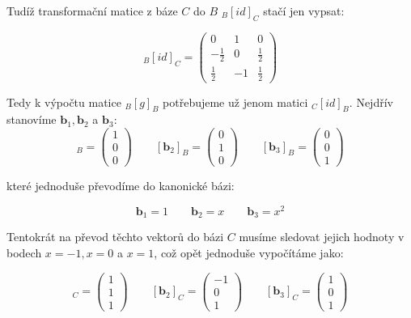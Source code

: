 \documentclass{../../../ksp}
\begin{document}
Tudíž transformační matice z báze $C$ do $B$ $_B[id]_C$ stačí jen vypsat:

\begin{equation}
    _B[id]_C = 
    \begin{pmatrix}
        0 & 1 & 0\\
        -\frac{1}{2} & 0 & \frac{1}{2}\\
        \frac{1}{2} & -1 & \frac{1}{2}
    \end{pmatrix}
\end{equation}

Tedy k výpočtu matice $_B[g]_B$ potřebujeme už jenom matici $_C[id]_B$.
Nejdřív stanovíme $\bm{b}_1, \bm{b}_2$ a $\bm{b}_3$:
\begin{equation}
    [\bm{b}_1]_B =
    \begin{pmatrix}
        1\\
        0\\
        0
    \end{pmatrix}
    \qquad
    [\bm{b}_2]_B =
    \begin{pmatrix}
        0\\
        1\\
        0
    \end{pmatrix}
    \qquad
    [\bm{b}_3]_B =
    \begin{pmatrix}
        0\\
        0\\
        1
    \end{pmatrix}
\end{equation}

které jednoduše převodíme do kanonické bázi:

\begin{equation}
    \bm{b}_1 = 1
    \qquad
    \bm{b}_2 = x
    \qquad
    \bm{b}_3 = x^2
\end{equation}

Tentokrát na převod těchto vektorů do bázi $C$ musíme sledovat jejich hodnoty v bodech
$x = -1, x = 0$ a $x = 1$, což opět jednoduše vypočítáme jako:

\begin{equation}
    [\bm{b}_1]_C =
    \begin{pmatrix}
        1\\
        1\\
        1
    \end{pmatrix}
    \qquad
    [\bm{b}_2]_C =
    \begin{pmatrix}
        -1\\
        0\\
        1
    \end{pmatrix}
    \qquad
    [\bm{b}_3]_C =
    \begin{pmatrix}
        1\\
        0\\
        1
    \end{pmatrix}
\end{equation}
\end{document}
